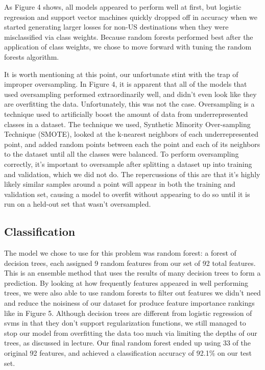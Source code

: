 \documentclass[a4paper, 11pt]{article}
\begin{document}
As Figure 4 shows, all models appeared to perform well at first, but logistic regression and support vector machines quickly dropped off in accuracy when we started generating larger losses for non-US destinations when they were misclassified via class weights. Because random forests performed best after the application of class weights, we chose to move forward with tuning the random forests algorithm.
\par
    It is worth mentioning at this point, our unfortunate stint with the trap of improper oversampling. In Figure 4, it is apparent that all of the models that used oversampling performed extraordinarily well, and didn’t even look like they are overfitting the data. Unfortunately, this was not the case. Oversampling is a technique used to artificially boost the amount of data from underrepresented classes in a dataset. The technique we used, Synthetic Minority Over-sampling Technique (SMOTE), looked at the k-nearest neighbors of each underrepresented point, and added random points between each the point and each of its neighbors to the dataset until all the classes were balanced. To perform oversampling correctly, it’s important to oversample after splitting a dataset up into training and validation, which we did not do. The repercussions of this are that it’s highly likely similar samples around a point will appear in both the training and validation set, causing a model to overfit without appearing to do so until it is run on a held-out set that wasn’t oversampled.

\subsection*{Classification}
\par
The model we chose to use for this problem was random forest: a forest of decision trees, each assigned 9 random features from our set of 92 total features. This is an ensemble method that uses the results of many decision trees to form a prediction. By looking at how frequently features appeared in well performing trees, we were also able to use random forests to filter out features we didn’t need and reduce the noisiness of our dataset for produce feature importance rankings like in Figure 5. Although decision trees are different from logistic regression of svms in that they don’t support regularization functions, we still managed to stop our model from overfitting the data too much via limiting the depths of our trees, as discussed in lecture. Our final random forest ended up using 33 of the original 92 features, and achieved a classification accuracy of 92.1\% on our test set. 
\end{document}
